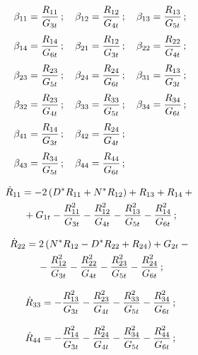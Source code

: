 \begin{multicols}{2}
\noindent
\begin{align*}
\beta_{11}&=\fr{R_{11}}{G_{3t}}\,;\quad  \beta_{12}=\fr{R_{12}}{G_{4t}}\,;\quad \beta_{13}=\fr{R_{13}}{G_{5t}}\,;\\[2pt]
\beta_{14}&=\fr{R_{14}}{G_{6t}}\,;\quad \beta_{21}=\fr{R_{12}}{G_{3t}}\,;\quad \beta_{22}=\fr{R_{22}}{G_{4t}}\,;\\[2pt]
\beta_{23}&=\fr{R_{23}}{G_{5t}}\,;\quad \beta_{24}=\fr{R_{24}}{G_{6t}}\,;\quad \beta_{31}=\fr{R_{13}}{G_{3t}}\,;\\[2pt]
\beta_{32}&=\fr{R_{23}}{G_{4t}}\,;\quad \beta_{33}=\fr{R_{33}}{G_{5t}}\,;\quad \beta_{34}=\fr{R_{34}}{G_{6t}}\,;\\[2pt]
\beta_{41}&=\fr{R_{14}}{G_{3t}}\,;\quad \beta_{42}=\fr{R_{24}}{G_{4t}}\,;\\[2pt]
\beta_{43}&=\fr{R_{34}}{G_{5t}}\,;\quad \beta_{44}=\fr{R_{44}}{G_{6t}}\,;
\end{align*}


\noindent
\begin{multline*}
\dot R_{11} =- 2\left(D^* R_{11} + N^* R_{12}\right) +R_{13}+R_{14}+{}\\
{}+ G_{1t} - \fr{R_{11}^2}{G_{3t}} - \fr{R_{12}^2}{G_{4t}}-  \fr{R_{13}^2}{G_{5t}}- \fr{R_{14}^2}{G_{6t}}\,;
       \end{multline*}
       
       \vspace*{-12pt}
       
       \noindent
\begin{multline*}
\dot R_{22} = 2\left(N^* R_{12} -D^* R_{22}+R_{24}\right) + G_{2t} -{}\\
{}- \fr{R_{12}^2}{G_{3t}} - \fr{R_{22}^2}{G_{4t}}- \fr{R_{23}^2}{G_{5t}}- \fr{R_{24}^2}{G_{6t}}\,;
\end{multline*}

\noindent
\begin{equation*}
\dot R_{33} =- \fr{R_{13}^2}{G_{3t}} -\fr{R_{23}^2}{G_{4t}} - \fr{R_{33}^2}{G_{5t}}- \fr{R_{34}^2}{G_{6t}}\,;
\end{equation*}


\noindent
\begin{equation*}
\dot R_{44} = -\fr{R_{14}^2}{G_{3t}} -\fr{R_{24}^2}{G_{4t}} - \fr{R_{34}^2}{G_{5t}}- \fr{R_{44}^2}{G_{6t}}\,;
\end{equation*}


\end{multicols}
